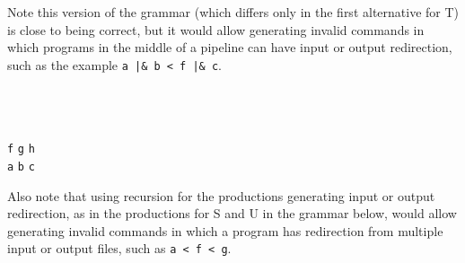 \documentclass[11pt,fleqn]{article}
\begin{document}
\begin{enumerate}
\begin{minipage}[t]{6in}
\begin{grammar}[2]
            \end{grammar}

          \end{minipage}

          \medskip

          \addtolength{\columnsep}{2mm}

          \begin{multicols}{2}

            Note this version of the grammar (which differs only in the
            first alternative for T) is close to being correct, but it would
            allow generating invalid commands in which programs in the
            middle of a pipeline can have input or output redirection, such
            as the example \texttt{a |\& b < f |\& c}.

            \smallskip

            \hspace{.2in}
            \begin{minipage}[t]{2.9in}

              \begin{grammar}[2]

                \\

                \\

                \\

                           {\texttt{f} \midspc \texttt{g} \midspc \texttt{h}}
                \\

                           {\texttt{a} \midspc \texttt{b} \midspc \texttt{c}}
                \\

              \end{grammar}

            \end{minipage}

            \columnbreak

            Also note that using recursion for the productions generating
            input or output redirection, as in the productions for S and U
            in the grammar below, would allow generating invalid commands in
            which a program has redirection from multiple input or output
            files, such as \texttt{a < f < g}.


\end{multicols}
\end{enumerate}
\end{document}

